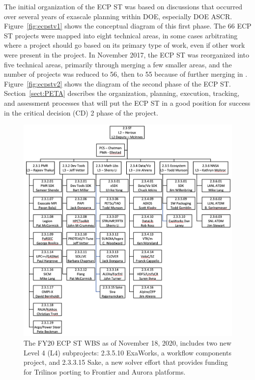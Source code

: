 The initial organization of the ECP ST was based on discussions that occurred over several years of exascale planning within DOE, especially DOE ASCR.  Figure~\ref{fig:ecpstv1}  shows the conceptual diagram of this first phase.  The 66 ECP ST projects were mapped into eight technical areas, in some cases arbitrating where a project should go based on its primary type of work, even if other work were present in the project.  In November 2017, the ECP ST was reorganized into five technical areas, primarily through merging a few smaller areas, and the number of projects was reduced to 56, then to 55 because of further merging in \ecosystem.  Figure~\ref{fig:ecpstv2} shows the diagram of the second phase of the ECP ST.  Section~\ref{sect:PETA} describes the organization, planning, execution, tracking, and assessment processes that will put the ECP ST in a good position for success in the critical decision (CD) 2 phase of the project.

\begin{figure}
	\centering
	\includegraphics[width=0.9\linewidth]{STFY20WBS}
	\caption{\label{fig:wbs-FY20} The FY20 ECP ST WBS as of November 18, 2020, includes two new Level 4 (L4) subprojects: 2.3.5.10 ExaWorks, a workflow components project, and 2.3.3.15 Sake, a new solver effort that provides funding for Trilinos porting to Frontier and Aurora platforms.}
    \protect{}
\end{figure}

